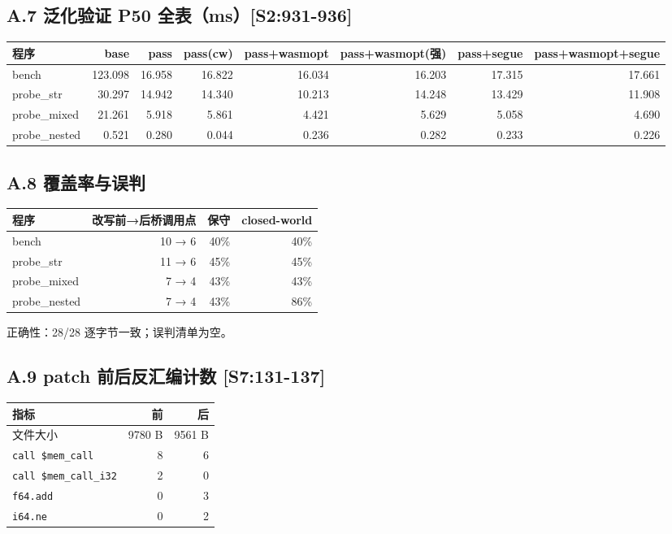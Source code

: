 \documentclass[11pt, a4paper]{article}
\begin{document}
\subsection{A.7 泛化验证 P50 全表（ms）[S2:931-936]}

\begin{center}\small\begin{tabular}{lrrrrrrr}
\toprule
程序 & base & pass & pass(cw) & pass+wasmopt & pass+wasmopt(强) & pass+segue & pass+wasmopt+segue \\
\midrule
bench & 123.098 & 16.958 & 16.822 & 16.034 & 16.203 & 17.315 & 17.661 \\
probe\_str & 30.297 & 14.942 & 14.340 & 10.213 & 14.248 & 13.429 & 11.908 \\
probe\_mixed & 21.261 & 5.918 & 5.861 & 4.421 & 5.629 & 5.058 & 4.690 \\
probe\_nested & 0.521 & 0.280 & 0.044 & 0.236 & 0.282 & 0.233 & 0.226 \\
\bottomrule
\end{tabular}\end{center}


\subsection{A.8 覆盖率与误判}

\begin{center}\small\begin{tabular}{lrrr}
\toprule
程序 & 改写前→后桥调用点 & 保守 & closed-world \\
\midrule
bench & 10 → 6 & 40\% & 40\% \\
probe\_str & 11 → 6 & 45\% & 45\% \\
probe\_mixed & 7 → 4 & 43\% & 43\% \\
probe\_nested & 7 → 4 & 43\% & 86\% \\
\bottomrule
\end{tabular}\end{center}


正确性：28/28 逐字节一致；误判清单为空。


\subsection{A.9 patch 前后反汇编计数 [S7:131-137]}

\begin{center}\small\begin{tabular}{lrr}
\toprule
指标 & 前 & 后 \\
\midrule
文件大小 & 9780 B & 9561 B \\
\texttt{call \$mem\_call} & 8 & 6 \\
\texttt{call \$mem\_call\_i32} & 2 & 0 \\
\texttt{f64.add} & 0 & 3 \\
\texttt{i64.ne} & 0 & 2 \\
\bottomrule
\end{tabular}\end{center}
\end{document}
